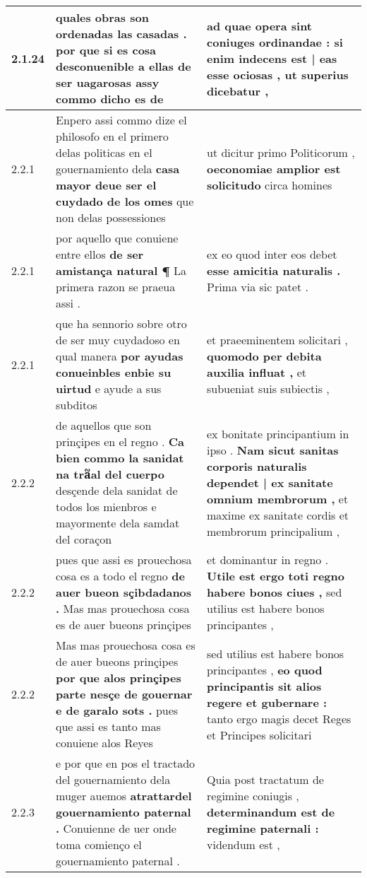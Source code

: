 \begin{tabular}{|p{1cm}|p{6.5cm}|p{6.5cm}|}
2.1.24 & quales obras son ordenadas las casadas . \textbf{ por que si es cosa desconuenible a ellas de ser uagarosas } assy commo dicho es de & ad quae opera sint coniuges ordinandae : \textbf{ si enim indecens est | eas esse ociosas , } ut superius dicebatur , \\\hline
2.2.1 & Enpero assi commo dize el philosofo en el primero delas politicas en el gouernamiento dela \textbf{ casa mayor deue ser el cuydado de los omes } que non delas possessiones & ut dicitur primo Politicorum , \textbf{ oeconomiae amplior est solicitudo } circa homines \\\hline
2.2.1 & por aquello que conuiene entre ellos \textbf{ de ser amistança natural ¶ } La primera razon se praeua assi . & ex eo quod inter eos debet \textbf{ esse amicitia naturalis . } Prima via sic patet . \\\hline
2.2.1 & que ha sennorio sobre otro de ser muy cuydadoso en qual manera \textbf{ por ayudas conueinbles enbie su uirtud } e ayude a sus subditos & et praeeminentem solicitari , \textbf{ quomodo per debita auxilia influat , } et subueniat suis subiectis , \\\hline
2.2.2 & de aquellos que son prinçipes en el regno . \textbf{ Ca bien commo la sanidat na tra᷑al del cuerpo } desçende dela sanidat de todos los mienbros e mayormente dela samdat del coraçon & ex bonitate principantium in ipso . \textbf{ Nam sicut sanitas corporis naturalis dependet | ex sanitate omnium membrorum , } et maxime ex sanitate cordis et membrorum principalium , \\\hline
2.2.2 & pues que assi es prouechosa cosa es a todo el regno \textbf{ de auer bueon sçibdadanos . } Mas mas prouechosa cosa es de auer bueons prinçipes & et dominantur in regno . \textbf{ Utile est ergo toti regno habere bonos ciues , } sed utilius est habere bonos principantes , \\\hline
2.2.2 & Mas mas prouechosa cosa es de auer bueons prinçipes \textbf{ por que alos prinçipes parte nesçe de gouernar e de garalo sots . } pues que assi es tanto mas conuiene alos Reyes & sed utilius est habere bonos principantes , \textbf{ eo quod principantis sit alios regere et gubernare : } tanto ergo magis decet Reges et Principes solicitari \\\hline
2.2.3 & e por que en pos el tractado del gouernamiento dela muger auemos \textbf{ atrattardel gouernamiento paternal . } Conuienne de uer onde toma comienço el gouernamiento paternal . & Quia post tractatum de regimine coniugis , \textbf{ determinandum est de regimine paternali : } videndum est , \\\hline

\end{tabular}
